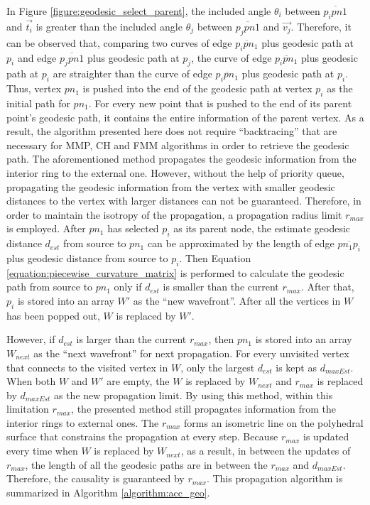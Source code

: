 In Figure \ref{figure:geodesic_select_parent}, the included angle $\theta_{i}$ between $\overline{p_{i}pn{1}}$ and $\vec{t_{i}}$ is greater than the included angle $\theta_{j}$ between $\overline{p_{j}pn{1}}$ and $\vec{v_{j}}$. Therefore, it can be observed that, comparing two curves of edge $\overline{p_{i}pn_{1}}$ plus geodesic path at $p_{i}$ and edge $\overline{p_{j}pn{1}}$ plus geodesic path at $p_{j}$, the curve of edge $\overline{p_{i}pn_{1}}$ plus geodesic path at $p_{i}$ are straighter than the curve of edge $\overline{p_{i}pn_{1}}$ plus geodesic path at $p_{i}$. Thus, vertex $pn_{1}$ is pushed into the end of the geodesic path at vertex $p_{i}$ as the initial path for $pn_{1}$. For every new point that is pushed to the end of its parent point's geodesic path, it contains the entire information of the parent vertex. As a result, the algorithm presented here does not require ``backtracing'' that are necessary for MMP, CH and FMM algorithms in order to retrieve the geodesic path. The aforementioned method propagates the geodesic information from the interior ring to the external one. However, without the help of priority queue, propagating the geodesic information from the vertex with smaller geodesic distances to the vertex with larger distances can not be guaranteed. Therefore, in order to maintain the isotropy of the propagation, a propagation radius limit $r_{max}$ is employed. After $pn_{1}$ has selected $p_{i}$ as its parent node, the estimate geodesic distance $d_{est}$ from source to $pn_{1}$ can be approximated by the length of edge $\overline{pn_{1}p_{i}}$ plus geodesic distance from source to $p_{i}$. Then Equation \ref{equation:piecewise_curvature_matrix} is performed to calculate the geodesic path from source to $pn_{1}$ only if $d_{est}$ is smaller than the current $r_{max}$. After that, $p_{i}$ is stored into an array $W'$ as the ``new wavefront''. After all the vertices in $W$ has been popped out, $W$ is replaced by $W'$. 

However, if $d_{est}$ is larger than the current $r_{max}$, then $pn_{1}$ is stored into an array $W_{next}$ as the ``next wavefront'' for next propagation. For every unvisited vertex that connects to the visited vertex in $W$, only the largest $d_{est}$ is kept as $d_{maxEst}$. When both $W$ and $W'$ are empty, the $W$ is replaced by $W_{next}$ and $r_{max}$ is replaced by $d_{maxEst}$ as the new propagation limit. By using this method, within this limitation $r_{max}$, the presented method  still propagates information from the interior rings to external ones. The $r_{max}$ forms an isometric line on the polyhedral surface that constrains the propagation at every step. Because $r_{max}$ is updated every time when $W$ is replaced by $W_{next}$, as a result, in between the updates of $r_{max}$, the length of all the geodesic paths are in between the $r_{max}$ and $d_{maxEst}$. Therefore, the causality is guaranteed by $r_{max}$. This propagation algorithm is summarized in Algorithm \ref{algorithm:acc_geo}.
%

